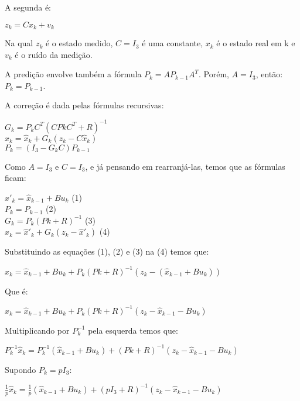 \documentclass[12 pt]{article}
\begin{document}
A segunda é:
\begin{center}
$z_{k} = C x_{k} + v_{k}$
\end{center}

Na qual $z_{k}$ é o estado medido, $C = I_{3}$ é uma constante, $x_{k}$ é o estado real em k e $v_{k}$ é o ruído da medição.

A predição envolve também a fórmula $P_{k}=AP_{k-1}A^{T}$. Porém, $A = I_{3}$, então: $P_{k}=P_{k-1}$.

A correção é dada pelas fórmulas recursivas: 
\begin{center}
$G_{k} = P_{k}C^{T}(CP{k}C^{T}+R)^{-1} $\\
$\hat{x}_{k} = \hat{x}_{k} + G_{k}(z_{k} - C\hat{x}_{k})$\\
$P_{k} = (I_{3} - G_{k}C)P_{k-1}$
\end{center}

Como $A=I_{3}$ e $C=I_{3}$, e já pensando em rearranjá-las, temos que as fórmulas ficam:
\begin{center}
$\hat{x}'_{k} = \hat{x}_{k-1} + Bu_{k}$ (1)\\
$P_{k} = P_{k-1}$ (2)\\
$G_{k} = P_{k}(P{k}+R)^{-1}$ (3)\\
$\hat{x}_{k} = \hat{x}'_{k} + G_{k}(z_{k} - \hat{x}'_{k})$ (4)\\
\end{center}

Substituindo as equações (1), (2) e (3) na (4) temos que:
\begin{center}
$\hat{x}_{k} = \hat{x}_{k-1} + Bu_{k} + P_{k}(P{k}+R)^{-1}(z_{k} - (\hat{x}_{k-1} + Bu_{k}))$
\end{center}

Que é:
\begin{center}
$\hat{x}_{k} = \hat{x}_{k-1} + Bu_{k} + P_{k}(P{k}+R)^{-1}(z_{k} - \hat{x}_{k-1} - Bu_{k})$
\end{center}

Multiplicando por $P_{k}^{-1}$ pela esquerda temos que:

\begin{center}
$P_{k}^{-1}\hat{x}_{k} = P_{k}^{-1}(\hat{x}_{k-1} + Bu_{k}) + (P{k}+R)^{-1}(z_{k} - \hat{x}_{k-1} - Bu_{k})$
\end{center}

Supondo $P_{k} = pI_{3}$:

\begin{center}
$\frac{1}{p}\hat{x}_{k} = \frac{1}{p}(\hat{x}_{k-1} + Bu_{k}) + (pI_{3}+R)^{-1}(z_{k} - \hat{x}_{k-1} - Bu_{k})$
\end{center}
\end{document}
